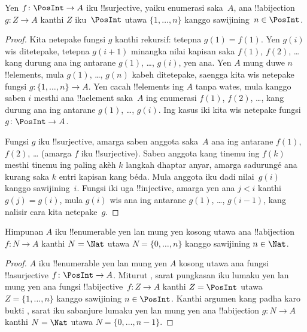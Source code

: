 \documentclass[../../../include/open-logic-section]{subfiles}
\begin{document}
\begin{prop}
Yen $f\colon \PosInt \to A$ iku !!{surjective}, yaiku enumerasi
saka~$A$, ana !!a{bijection} $g\colon Z \to A$ kanthi $Z$
iku~$\PosInt$ utawa $\{1, \dots, n\}$ kanggo sawijining~$n \in \PosInt$.
\end{prop}

\begin{proof}
  Kita netepake fungsi $g$ kanthi rekursif: tetepna $g(1) = f(1)$. Yen $g(i)$
  wis ditetepake, tetepna $g(i+1)$ minangka nilai kapisan saka $f(1)$,
  $f(2)$, \dots{} kang durung ana ing antarane $g(1)$, \dots, $g(i)$, yen ana.
  Yen $A$ mung duwe $n$ !!{element}s, mula $g(1)$, \dots, $g(n)$ kabeh
  ditetepake, saengga kita wis netepake fungsi $g\colon \{1, \dots, n\}
  \to A$. Yen cacah !!{element}s ing $A$ tanpa wates, mula kanggo saben $i$
  mesthi ana !!a{element} saka~$A$ ing enumerasi $f(1)$, $f(2)$,
  \dots, kang durung ana ing antarane $g(1)$, \dots, $g(i)$. Ing kasus
  iki kita wis netepake fungsi $g\colon \PosInt \to A$.

  Fungsi $g$ iku !!{surjective}, amarga saben anggota saka~$A$ ana
  ing antarane $f(1)$, $f(2)$, \dots{} (amarga $f$ iku !!{surjective}).
  Saben anggota kang tinemu ing $f(k)$ mesthi tinemu
ing paling akèh $k$ langkah dhaptar anyar, amarga sadurungé ana kurang saka
  $k$ entri kapisan kang béda. Mula anggota iku dadi nilai~$g(i)$
  kanggo sawijining~$i$. Fungsi iki uga
  !!{injective}, amarga yen ana $j < i$ kanthi $g(j) = g(i)$,
  mula $g(i)$ wis ana ing antarane $g(1)$, \dots, $g(i-1)$, kang
  nalisir cara kita netepake~$g$.
\end{proof}

\begin{cor}
Himpunan $A$ iku !!{enumerable} yen lan mung yen kosong utawa ana !!a{bijection}
$f\colon N \to A$ kanthi $N = \Nat$ utawa $N = \{0, \dots, n\}$ kanggo
sawijining $n \in \Nat$.
\end{cor}

\begin{proof}
$A$ iku !!{enumerable} yen lan mung yen $A$ kosong utawa ana fungsi !!a{surjective}
$f\colon \PosInt \to A$. Miturut , sarat pungkasan iku
lumaku yen lan mung yen ana fungsi !!a{bijective}~$f\colon Z \to A$ kanthi $Z =
\PosInt$ utawa $Z = \{1, \dots, n\}$ kanggo sawijining $n \in \PosInt$. Kanthi
argumen kang padha karo bukti , sarat iku sabanjure
lumaku yen lan mung yen ana !!a{bijection} $g\colon N \to A$ kanthi
$N = \Nat$ utawa $N = \{0, \dots, n-1\}$.
\end{proof}
\end{document}
